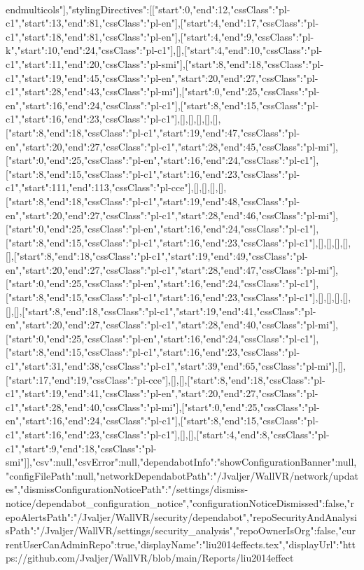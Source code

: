 \\end{multicols}"],"stylingDirectives":[[{"start":0,"end":12,"cssClass":"pl-c1"},{"start":13,"end":81,"cssClass":"pl-en"}],[{"start":4,"end":17,"cssClass":"pl-c1"},{"start":18,"end":81,"cssClass":"pl-en"}],[{"start":4,"end":9,"cssClass":"pl-k"},{"start":10,"end":24,"cssClass":"pl-c1"}],[],[{"start":4,"end":10,"cssClass":"pl-c1"},{"start":11,"end":20,"cssClass":"pl-smi"}],[{"start":8,"end":18,"cssClass":"pl-c1"},{"start":19,"end":45,"cssClass":"pl-en"},{"start":20,"end":27,"cssClass":"pl-c1"},{"start":28,"end":43,"cssClass":"pl-mi"}],[{"start":0,"end":25,"cssClass":"pl-en"},{"start":16,"end":24,"cssClass":"pl-c1"}],[{"start":8,"end":15,"cssClass":"pl-c1"},{"start":16,"end":23,"cssClass":"pl-c1"}],[],[],[],[],[],[{"start":8,"end":18,"cssClass":"pl-c1"},{"start":19,"end":47,"cssClass":"pl-en"},{"start":20,"end":27,"cssClass":"pl-c1"},{"start":28,"end":45,"cssClass":"pl-mi"}],[{"start":0,"end":25,"cssClass":"pl-en"},{"start":16,"end":24,"cssClass":"pl-c1"}],[{"start":8,"end":15,"cssClass":"pl-c1"},{"start":16,"end":23,"cssClass":"pl-c1"},{"start":111,"end":113,"cssClass":"pl-cce"}],[],[],[],[],[{"start":8,"end":18,"cssClass":"pl-c1"},{"start":19,"end":48,"cssClass":"pl-en"},{"start":20,"end":27,"cssClass":"pl-c1"},{"start":28,"end":46,"cssClass":"pl-mi"}],[{"start":0,"end":25,"cssClass":"pl-en"},{"start":16,"end":24,"cssClass":"pl-c1"}],[{"start":8,"end":15,"cssClass":"pl-c1"},{"start":16,"end":23,"cssClass":"pl-c1"}],[],[],[],[],[],[{"start":8,"end":18,"cssClass":"pl-c1"},{"start":19,"end":49,"cssClass":"pl-en"},{"start":20,"end":27,"cssClass":"pl-c1"},{"start":28,"end":47,"cssClass":"pl-mi"}],[{"start":0,"end":25,"cssClass":"pl-en"},{"start":16,"end":24,"cssClass":"pl-c1"}],[{"start":8,"end":15,"cssClass":"pl-c1"},{"start":16,"end":23,"cssClass":"pl-c1"}],[],[],[],[],[],[],[{"start":8,"end":18,"cssClass":"pl-c1"},{"start":19,"end":41,"cssClass":"pl-en"},{"start":20,"end":27,"cssClass":"pl-c1"},{"start":28,"end":40,"cssClass":"pl-mi"}],[{"start":0,"end":25,"cssClass":"pl-en"},{"start":16,"end":24,"cssClass":"pl-c1"}],[{"start":8,"end":15,"cssClass":"pl-c1"},{"start":16,"end":23,"cssClass":"pl-c1"},{"start":31,"end":38,"cssClass":"pl-c1"},{"start":39,"end":65,"cssClass":"pl-mi"}],[],[{"start":17,"end":19,"cssClass":"pl-cce"}],[],[],[{"start":8,"end":18,"cssClass":"pl-c1"},{"start":19,"end":41,"cssClass":"pl-en"},{"start":20,"end":27,"cssClass":"pl-c1"},{"start":28,"end":40,"cssClass":"pl-mi"}],[{"start":0,"end":25,"cssClass":"pl-en"},{"start":16,"end":24,"cssClass":"pl-c1"}],[{"start":8,"end":15,"cssClass":"pl-c1"},{"start":16,"end":23,"cssClass":"pl-c1"}],[],[],[{"start":4,"end":8,"cssClass":"pl-c1"},{"start":9,"end":18,"cssClass":"pl-smi"}]],"csv":null,"csvError":null,"dependabotInfo":{"showConfigurationBanner":null,"configFilePath":null,"networkDependabotPath":"/Jvaljer/WallVR/network/updates","dismissConfigurationNoticePath":"/settings/dismiss-notice/dependabot_configuration_notice","configurationNoticeDismissed":false,"repoAlertsPath":"/Jvaljer/WallVR/security/dependabot","repoSecurityAndAnalysisPath":"/Jvaljer/WallVR/settings/security_analysis","repoOwnerIsOrg":false,"currentUserCanAdminRepo":true},"displayName":"liu2014effects.tex","displayUrl":"https://github.com/Jvaljer/WallVR/blob/main/Reports/liu2014effect